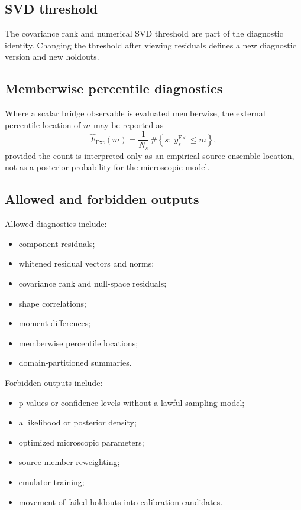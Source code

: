 \documentclass[11pt]{article}
\newcommand{\Ext}{\ensuremath{\mathrm{Ext}}}
\begin{document}
\subsection{SVD threshold}

The covariance rank and numerical SVD threshold are part of the diagnostic identity.  Changing the threshold after viewing residuals defines a new diagnostic version and new holdouts.

\subsection{Memberwise percentile diagnostics}

Where a scalar bridge observable is evaluated memberwise, the external percentile location of \(m\) may be reported as
\begin{equation}
 \widehat F_{\Ext}(m)
 =
 \frac{1}{N_s}\,\#\!\left\{s:\ y_s^{\Ext}\le m\right\},
 \label{eq:empirical-percentile}
\end{equation}
provided the count is interpreted only as an empirical source-ensemble location, not as a posterior probability for the microscopic model.

\subsection{Allowed and forbidden outputs}

Allowed diagnostics include:
\begin{itemize}
\item component residuals;
\item whitened residual vectors and norms;
\item covariance rank and null-space residuals;
\item shape correlations;
\item moment differences;
\item memberwise percentile locations;
\item domain-partitioned summaries.
\end{itemize}
Forbidden outputs include:
\begin{itemize}
\item p-values or confidence levels without a lawful sampling model;
\item a likelihood or posterior density;
\item optimized microscopic parameters;
\item source-member reweighting;
\item emulator training;
\item movement of failed holdouts into calibration candidates.
\end{itemize}
\end{document}
